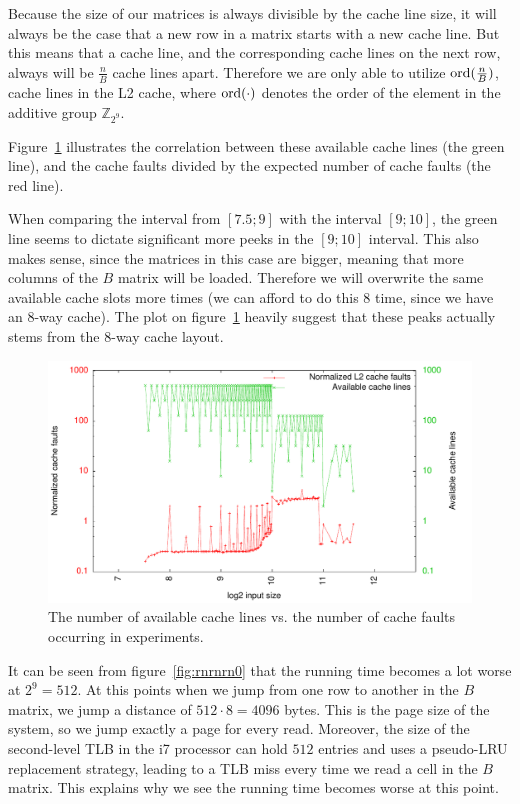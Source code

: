 Because the size of our matrices is always divisible by the cache line
size, it will always be the case that a new row in a matrix starts
with a new cache line. But this means that a cache line, and the
corresponding cache lines on the next row, always will be
$\frac{n}{B}$ cache lines apart. Therefore we are only able to utilize
$\operatorname{ord}(\frac{n}{B})$, cache lines in the L2 cache, where $\operatorname{ord}(\cdot)$
denotes the order of the element in the additive group
$\mathbb{Z}_{2^9}$.

Figure~\ref{fig:rowrow_cachepeaks} illustrates the correlation between
these available cache lines (the green line), and the
cache faults divided by the expected number of cache faults (the red
line).

When comparing the interval from $[7.5; 9]$ with the interval $[9;
  10]$, the green line seems to dictate significant more peeks in the
$[9; 10]$ interval. This also makes sense, since the matrices in this
case are bigger, meaning that more columns of the $B$ matrix will be
loaded. Therefore we will overwrite the same available cache slots
more times (we can afford to do this 8 time, since we have an 8-way
cache). The plot on figure~\ref{fig:rowrow_cachepeaks} heavily suggest
that these peaks actually stems from the 8-way cache layout.

\begin{figure}[h!]
  \centering
  \includegraphics{plots/rowrow_cachepeaks}
  \caption{The number of available cache lines vs. the number of cache
    faults occurring in experiments.}
  \label{fig:rowrow_cachepeaks}
\end{figure}

It can be seen from figure~\ref{fig:rnrnrn0} that the running time
becomes a lot worse at $2^9 = 512$. At this points when we jump from
one row to another in the $B$ matrix, we jump a distance of $512 \cdot
8 = 4096$ bytes. This is the page size of the system, so we jump
exactly a page for every read. Moreover, the size of the second-level
TLB in the i7 processor can hold $512$ entries and uses a pseudo-LRU
replacement strategy, leading to a TLB miss every time we read a cell
in the $B$ matrix. This explains why we see the running time becomes
worse at this point.

